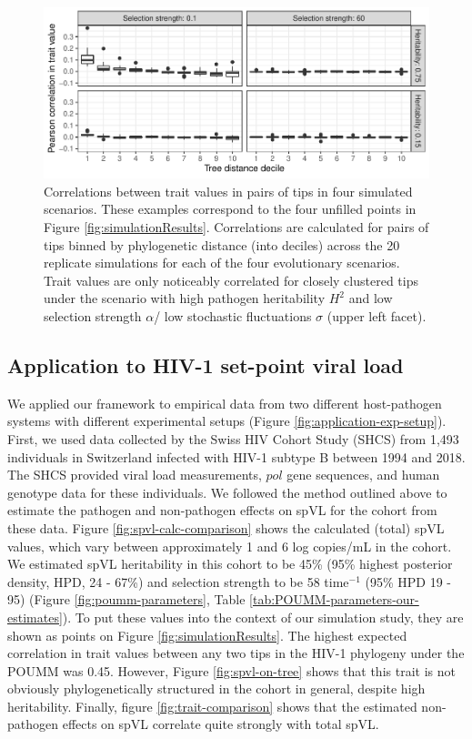 \documentclass[11pt]{article}
\begin{document}
\begin{linenumbers}
\begin{figure}[H]
\begin{center}
    \includegraphics[width = \linewidth]{fig4_Stadler_MBE-21-1179.pdf}
	\caption{Correlations between trait values in pairs of tips in four simulated scenarios. These examples correspond to the four unfilled points in Figure \ref{fig:simulationResults}. Correlations are calculated for pairs of tips binned by phylogenetic distance (into deciles) across the 20 replicate simulations for each of the four evolutionary scenarios. Trait values are only noticeably correlated for closely clustered tips under the scenario with high pathogen heritability $H^2$ and low selection strength $\alpha$/ low stochastic fluctuations $\sigma$ (upper left facet).}
	\label{fig:tip-trait-correlation}
	\end{center}
\end{figure}

\subsection*{Application to HIV-1 set-point viral load}

We applied our framework to empirical data from two different host-pathogen systems with different experimental setups (Figure \ref{fig:application-exp-setup}). First, we used data collected by the Swiss HIV Cohort Study (SHCS) from 1,493 individuals in Switzerland infected with HIV-1 subtype B between 1994 and 2018. The SHCS provided viral load measurements, $pol$ gene sequences, and human genotype data for these individuals. We followed the method outlined above to estimate the pathogen and non-pathogen effects on spVL for the cohort from these data. Figure \ref{fig:spvl-calc-comparison} shows the calculated (total) spVL values, which vary between approximately 1 and 6 log copies/mL in the cohort.  We estimated spVL heritability in this cohort to be 45\% (95\% highest posterior density, HPD, 24 - 67\%) and selection strength to be 58 time$^{-1}$ (95\% HPD 19 - 95) (Figure \ref{fig:poumm-parameters}, Table \ref{tab:POUMM-parameters-our-estimates}). To put these values into the context of our simulation study, they are shown as points on Figure \ref{fig:simulationResults}. The highest expected correlation in trait values between any two tips in the HIV-1 phylogeny under the POUMM was 0.45. However, Figure \ref{fig:spvl-on-tree} shows that this trait is not obviously phylogenetically structured in the cohort in general, despite high heritability. Finally, figure \ref{fig:trait-comparison} shows that the estimated non-pathogen effects on spVL correlate quite strongly with total spVL. 


\end{linenumbers}
\end{document}
